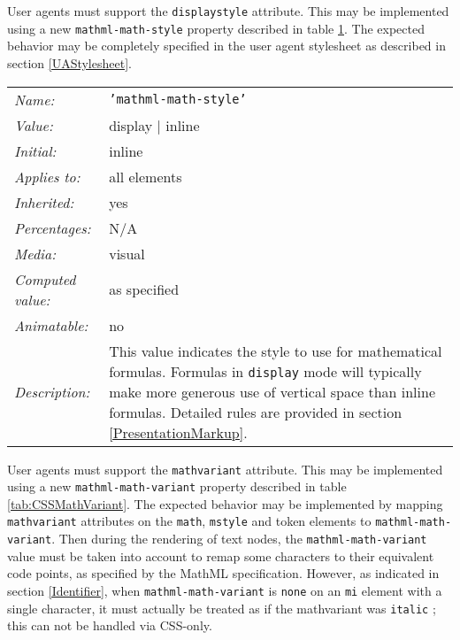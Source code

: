 User agents must support the {\tt displaystyle} attribute. This may be
implemented using a new {\tt mathml-math-style} property described in
table \ref{tab:CSSMathStyle}. The expected behavior may be completely
specified in the user agent stylesheet as described in section
\ref{UAStylesheet}.

\begin{table}
\begin{tabular}{ll}
  \emph{Name:} & {\tt 'mathml-math-style'} \\
  \emph{Value:} & display | inline \\
  \emph{Initial:} & inline \\
  \emph{Applies to:} & all elements \\
  \emph{Inherited:} & yes \\
  \emph{Percentages:} & N/A \\
  \emph{Media:} & visual \\
  \emph{Computed value:} & as specified \\
  \emph{Animatable:} & no \\
  \emph{Description:} & This value indicates the style to use for mathematical
  formulas. Formulas in {\tt display} mode will typically make more generous
  use of vertical space than inline formulas. Detailed rules are provided in
  section \ref{PresentationMarkup}.
\end{tabular}
\label{tab:CSSMathStyle}
\end{table}

User agents must support the {\tt mathvariant} attribute. This may be
implemented using a new {\tt mathml-math-variant} property described in
table \ref{tab:CSSMathVariant}. The expected behavior may be implemented by
mapping {\tt mathvariant} attributes on the {\tt math}, {\tt mstyle} and token
elements to {\tt mathml-math-variant}. Then during the rendering of text nodes,
the {\tt mathml-math-variant} value must be taken into account to remap
some characters to their equivalent code points, as specified by the MathML
specification. However, as indicated in section \ref{Identifier}, when
{\tt mathml-math-variant} is {\tt none} on an {\tt mi} element with a single
character, it must actually be treated as if the mathvariant was {\tt italic} ;
this can not be handled via CSS-only.

